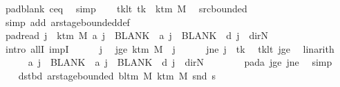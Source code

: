 \begin{isabellebody}
\ pad{\isacharunderscore}{\kern0pt}blank\ c{\isacharprime}{\kern0pt}{\isacharunderscore}{\kern0pt}eq\ \isamarkupfalse%
\ simp\isanewline
\ \ \isamarkupfalse%
\ tk{\isacharunderscore}{\kern0pt}lt{\isacharcolon}{\kern0pt}\ {\isachardoublequoteopen}tk\ {\isacharless}{\kern0pt}\ k{\isacharunderscore}{\kern0pt}tm\ M{\isachardoublequoteclose}\ \isamarkupfalse%
\ src{\isacharunderscore}{\kern0pt}bounded\ \isamarkupfalse%
\ {\isacharparenleft}{\kern0pt}simp\ add{\isacharcolon}{\kern0pt}\ ar{\isacharunderscore}{\kern0pt}stage{\isacharunderscore}{\kern0pt}bounded{\isacharunderscore}{\kern0pt}def{\isacharparenright}{\kern0pt}\isanewline
\ \ \isamarkupfalse%
\ pad{\isacharunderscore}{\kern0pt}read{\isacharcolon}{\kern0pt}\ {\isachardoublequoteopen}{\isasymforall}j\ {\isasymge}\ k{\isacharunderscore}{\kern0pt}tm\ M{\isachardot}{\kern0pt}\ {\isacharquery}{\kern0pt}a\ j\ {\isacharequal}{\kern0pt}\ BLANK{}\ {\isasymand}\ {\isacharquery}{\kern0pt}a\ j\ {\isacharequal}{\kern0pt}\ BLANK{}\ {\isasymand}\ {\isacharquery}{\kern0pt}d\ j\ {\isacharequal}{\kern0pt}\ dir{\isachardot}{\kern0pt}N{\isachardoublequoteclose}\isanewline
\ \ \isamarkupfalse%
\ {\isacharparenleft}{\kern0pt}intro\ allI\ impI{\isacharparenright}{\kern0pt}\isanewline
\ \ \ \ \isamarkupfalse%
\ j\ \isamarkupfalse%
\ jge{\isacharcolon}{\kern0pt}\ {\isachardoublequoteopen}k{\isacharunderscore}{\kern0pt}tm\ M\ {\isasymle}\ j{\isachardoublequoteclose}\isanewline
\ \ \ \ \isamarkupfalse%
\ jne{\isacharcolon}{\kern0pt}\ {\isachardoublequoteopen}j\ {\isasymnoteq}\ tk{\isachardoublequoteclose}\ \isamarkupfalse%
\ tk{\isacharunderscore}{\kern0pt}lt\ jge\ \isamarkupfalse%
\ linarith\isanewline
\ \ \ \ \isamarkupfalse%
\ {\isachardoublequoteopen}{\isacharquery}{\kern0pt}a\ j\ {\isacharequal}{\kern0pt}\ BLANK{}\ {\isasymand}\ {\isacharquery}{\kern0pt}a\ j\ {\isacharequal}{\kern0pt}\ BLANK{}\ {\isasymand}\ {\isacharquery}{\kern0pt}d\ j\ {\isacharequal}{\kern0pt}\ dir{\isachardot}{\kern0pt}N{\isachardoublequoteclose}\isanewline
\ \ \ \ \ \ \isamarkupfalse%
\ pad{\isacharunderscore}{\kern0pt}a\ jge\ jne\ \isamarkupfalse%
\ simp\isanewline
\ \ \isamarkupfalse%
\isanewline
\ \ \isamarkupfalse%
\ dst{\isacharunderscore}{\kern0pt}bd{\isacharcolon}{\kern0pt}\ {\isachardoublequoteopen}ar{\isacharunderscore}{\kern0pt}stage{\isacharunderscore}{\kern0pt}bounded\ {\isacharparenleft}{\kern0pt}bl{\isacharunderscore}{\kern0pt}tm\ M{\isacharparenright}{\kern0pt}\ {\isacharparenleft}{\kern0pt}k{\isacharunderscore}{\kern0pt}tm\ M{\isacharparenright}{\kern0pt}\ {\isacharparenleft}{\kern0pt}snd\ {\isacharquery}{\kern0pt}s{\isacharprime}{\kern0pt}{\isacharparenright}{\kern0pt}{\isachardoublequoteclose}\isanewline

\end{isabellebody}
